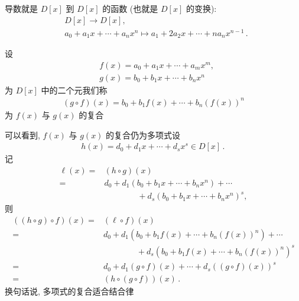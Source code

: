 \begin{remark}
    导数就是 $D[x]$ 到 $D[x]$ 的函数 (也就是 $D[x]$ 的变换):
    \begin{align*}
         & D[x] \to D[x], \tag*{$\prime \colon$}                                               \\
         & a_0 + a_1 x + \cdots + a_n x^n \mapsto a_1 + 2a_2 x + \cdots + na_n x^{n-1} \period
    \end{align*}
\end{remark}

\begin{definition}
    设
    \begin{align*}
         & f(x) = a_0 + a_1 x + \cdots + a_m x^m, \\
         & g(x) = b_0 + b_1 x + \cdots + b_n x^n
    \end{align*}
    为 $D[x]$ 中的二个元\period 我们称
    \begin{align*}
        (g \circ f)(x) = b_0 + b_1 f(x) + \cdots + b_n (f(x))^n
    \end{align*}
    为 $f(x)$ 与 $g(x)$ 的复合 \period
\end{definition}

\begin{remark}
    可以看到, $f(x)$ 与 $g(x)$ 的复合仍为多项式\period 设
    \begin{align*}
        h(x) = d_0 + d_1 x + \cdots + d_s x^s \in D[x] \period
    \end{align*}
    记
    \begin{align*}
        \ell(x)
        = {} & (h \circ g) (x)                                         \\
        = {} & d_0 + d_1 (b_0 + b_1 x + \cdots + b_n x^n) + \cdots     \\
             & \qquad \qquad + d_s (b_0 + b_1 x + \cdots + b_n x^n)^s,
    \end{align*}
    则
    \begin{align*}
        ((h \circ g) \circ f) (x)
        = {} & (\ell \circ f) (x)                                             \\
        = {} & d_0 + d_1 (b_0 + b_1 f(x) + \cdots + b_n (f(x))^n) + \cdots    \\
             & \qquad \qquad + d_s (b_0 + b_1 f(x) + \cdots + b_n (f(x))^n)^s \\
        = {} & d_0 + d_1 (g \circ f) (x) + \cdots + d_s ((g \circ f) (x))^s   \\
        = {} & (h \circ (g \circ f)) (x) \period
    \end{align*}
    换句话说, 多项式的复合适合结合律\period
\end{remark}

